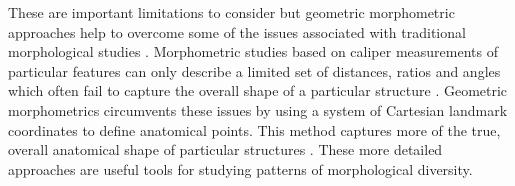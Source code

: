 	These are important limitations to consider but geometric morphometric\\ approaches help to overcome some of the issues associated with traditional morphological studies \citep{Adams2004}. Morphometric studies based on caliper measurements of particular features can only describe a limited set of distances, ratios and angles which often fail to capture the overall shape of a particular structure \citep{Slice2007}. Geometric morphometrics circumvents these issues by using a system of Cartesian landmark coordinates to define anatomical points. This method captures more of the true, overall anatomical shape of particular structures \citep{Mitteroecker2009}. These more detailed approaches are useful tools for studying patterns of morphological diversity.
	

	
